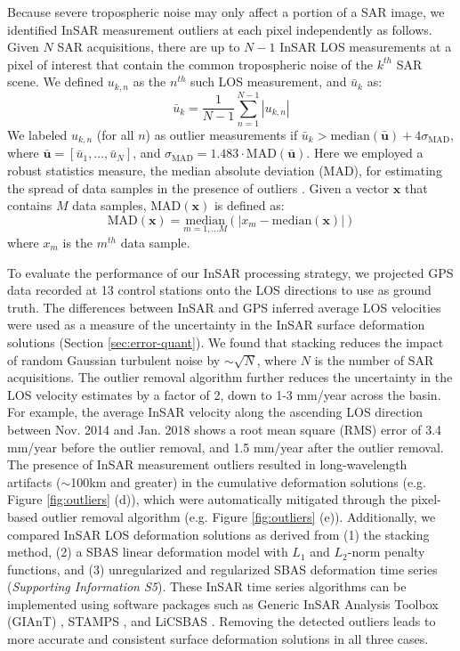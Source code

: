 \documentclass{utexasthesis}
\begin{document}
Because severe tropospheric noise may only affect a portion of a SAR image, we identified InSAR measurement outliers at each pixel independently as follows. Given $N$ SAR acquisitions, there are up to $N-1$ InSAR LOS measurements at a pixel of interest that contain the common tropospheric noise of the $k^{th}$ SAR scene. We defined $u_{k,n}$ as the $n^{th}$ such LOS measurement, and $\bar{u}_k$ as:
\begin{equation}
	\bar{u}_k  = \frac{1}{N-1} \sum_{n=1}^{N-1} |u_{k,n}|  
\end{equation}
We labeled $u_{k,n}$ (for all $n$) as outlier measurements if $\bar{u}_k > \mathrm{median}(\mathbf{\bar{u}}) + 4 \sigma_{\mathrm{MAD}}$, where $\mathbf{\bar{u}}=[\bar{u}_1,...,\bar{u}_N]$, and $\sigma_{\mathrm{MAD}}=1.483 \cdot \mathrm{MAD}(\mathbf{\bar{u}})$. Here we employed a robust statistics measure, the median absolute deviation (MAD), for estimating the spread of data samples in the presence of outliers \cite{Hampel1974, Rousseeuw2011}. Given a vector $\mathbf{x}$ that contains $M$ data samples, $\mathrm{MAD}(\mathbf{x})$ is defined as:
\begin{equation}
	\mathrm{MAD}(\mathbf{x}) =  \underset{m = 1,\ldots M}{\mathrm{median}} \left( \bigr\lvert  x_m - \mathrm{median}(\mathbf{x})  \bigr\rvert \right)
\end{equation}
where $x_m$ is the $m^{th}$ data sample. 

To evaluate the performance of our InSAR processing strategy, we projected GPS data recorded at 13 control stations onto the LOS directions to use as ground truth. The differences between InSAR and GPS inferred average LOS velocities were used as a measure of the uncertainty in the InSAR surface deformation solutions (Section \ref{sec:error-quant}). We found that stacking reduces the impact of random Gaussian turbulent noise by $ \sim \sqrt{N} $, where $ N $ is the number of SAR acquisitions. The outlier removal algorithm further reduces the uncertainty in the LOS velocity estimates by a factor of 2, down to 1-3 mm/year across the basin. For example, the average InSAR velocity along the ascending LOS direction between Nov. 2014 and Jan. 2018 shows a root mean square (RMS) error of 3.4 mm/year before the outlier removal, and 1.5 mm/year after the outlier removal. The presence of InSAR measurement outliers resulted in long-wavelength artifacts ($ \sim $100km and greater) in the cumulative deformation solutions (e.g. Figure \ref{fig:outliers} (d)), which were automatically mitigated through the pixel-based outlier removal algorithm (e.g. Figure \ref{fig:outliers} (e)). Additionally, we compared InSAR LOS deformation solutions as derived from (1) the stacking method, (2) a SBAS linear deformation model with $L_1$ and $L_2$-norm penalty functions, and (3) unregularized and regularized SBAS deformation time series (\textit{Supporting Information S5}). These InSAR time series algorithms can be implemented using software packages such as Generic InSAR Analysis Toolbox (GIAnT) \cite{agram2013new}, STAMPS \cite{hooper2012recent}, and LiCSBAS \cite{morishita2020licsbas}. Removing the detected outliers leads to more accurate and consistent surface deformation solutions in all three cases.
\end{document}

